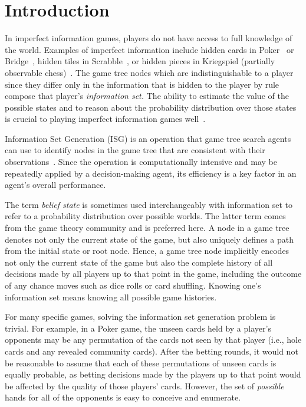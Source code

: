 \documentclass[10pt, conference, compsocconf]{IEEEtran}
\begin{document}
\section{Introduction}
In imperfect information games, players do not have access to full knowledge of
the world. Examples of imperfect information include hidden cards in
Poker~\cite{billings02challenge} or Bridge~\cite{ginsberg96partition}, hidden
tiles in Scrabble~\cite{richards07opponent}, or hidden pieces in 
Kriegspiel (partially observable chess)~\cite{li94chess}. The game tree nodes
which are indistinguishable to a player since they differ only in the
information that is hidden to the player by rule compose that player's {\em
information set.}  The ability to estimate the value of the possible states and
to reason about the probability distribution over those states is crucial to
playing imperfect information games well~\cite{schofield12hyperplay}. 

Information Set Generation (ISG) is an operation that game tree search agents
can use to identify nodes in the game tree that are consistent with their
observations~\cite{richards12information}.  Since the operation is
computationally intensive and may be repeatedly applied by a decision-making
agent, its efficiency is a key factor in an agent's overall performance.   

The term {\em belief state} is sometimes used interchangeably with information
set to refer to a probability distribution over possible worlds.  The latter
term comes from the game theory community and is preferred here.  A node in a
game tree denotes not only the current state of the game, but also uniquely
defines a path from the initial state or root node.  Hence, a game tree node
implicitly encodes not only the current state of the game but also the complete
history of all decisions made by all players up to that point in the game,
including the outcome of any chance moves such as dice rolls or card shuffling.
Knowing one's information set means knowing all possible game histories.

For many specific games, solving the information set generation problem is
trivial.  For example, in a Poker game, the unseen cards held by a player's
opponents may be any permutation of the cards not seen by that player (i.e.,
hole cards and any revealed community cards).  After the betting rounds, it
would not be reasonable to assume that each of these permutations of unseen
cards is equally probable, as betting decisions made by the players up to that
point would be affected by the quality of those players' cards.  However, the set of
{\em possible} hands for all of the opponents is easy to conceive and
enumerate.
\end{document}
